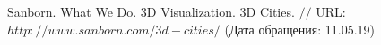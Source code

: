\makeatletter \renewcommand{} \makeatother
\renewcommand\refname{Список использованных источников}
\begin{thebibliography}{00}
	
	Sanborn. What We Do. 3D Visualization. 3D Cities. $//$ URL: $http://www.sanborn.com/3d-cities/$ (Дата обращения: 11.05.19)
\end{thebibliography}
